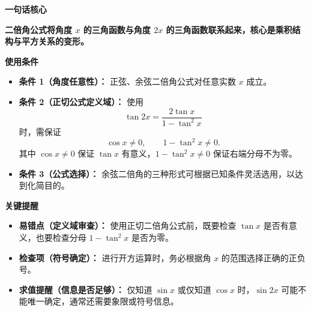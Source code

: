 \begin{summarybox}

	\textbf{\textcolor{CSummary}{一句话核心}}

	\textbf{二倍角公式将角度 $x$ 的三角函数与角度 $2x$ 的三角函数联系起来，核心是乘积结构与平方关系的变形。}

	\medskip
	\textbf{\textcolor{CSummary}{使用条件}}
	\begin{itemize}[leftmargin=*, itemsep=0.5em, topsep=0.4em]
		\item \textbf{条件 1（角度任意性）：} 正弦、余弦二倍角公式对任意实数 $x$ 成立。
		\item \textbf{条件 2（正切公式定义域）：} 使用
		      \[
			      \tan2x=\frac{2\tan x}{1-\tan^2x}
		      \]
		      时，需保证
		      \[
			      \cos x\ne0,\qquad 1-\tan^2x\ne0.
		      \]
		      其中 $\cos x\ne0$ 保证 $\tan x$ 有意义，$1-\tan^2x\ne0$ 保证右端分母不为零。
		\item \textbf{条件 3（公式选择）：} 余弦二倍角的三种形式可根据已知条件灵活选用，以达到化简目的。
	\end{itemize}

	\medskip
	\textbf{\textcolor{CSummary}{关键提醒}}
	\begin{itemize}[leftmargin=*, itemsep=0.5em, topsep=0.4em]
		\item \textbf{易错点（定义域审查）：} 使用正切二倍角公式前，既要检查 $\tan x$ 是否有意义，也要检查分母 $1-\tan^2x$ 是否为零。
		\item \textbf{检查项（符号确定）：} 进行开方运算时，务必根据角 $x$ 的范围选择正确的正负号。
		\item \textbf{求值提醒（信息是否足够）：} 仅知道 $\sin x$ 或仅知道 $\cos x$ 时，$\sin2x$ 可能不能唯一确定，通常还需要象限或符号信息。
	\end{itemize}

\end{summarybox}